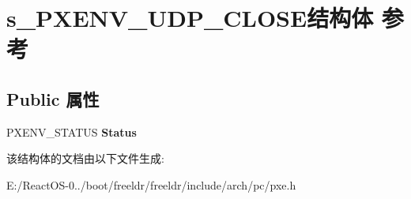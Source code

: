 \hypertarget{structs___p_x_e_n_v___u_d_p___c_l_o_s_e}{}\section{s\+\_\+\+P\+X\+E\+N\+V\+\_\+\+U\+D\+P\+\_\+\+C\+L\+O\+S\+E结构体 参考}
\label{structs___p_x_e_n_v___u_d_p___c_l_o_s_e}
\subsection*{Public 属性}
\begin{DoxyCompactItemize}
\item 
\mbox{\label{structs___p_x_e_n_v___u_d_p___c_l_o_s_e_a2228bee93b57f34d625a54ec68cf0ab0}} 
P\+X\+E\+N\+V\+\_\+\+S\+T\+A\+T\+US {\bfseries Status}
\end{DoxyCompactItemize}


该结构体的文档由以下文件生成\+:\begin{DoxyCompactItemize}
\item 
E\+:/\+React\+O\+S-\/0../boot/freeldr/freeldr/include/arch/pc/pxe.\+h\end{DoxyCompactItemize}
